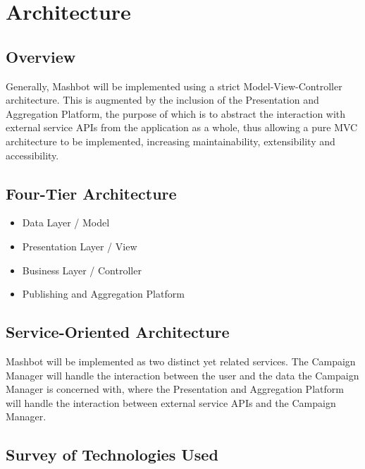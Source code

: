 \documentclass{article}
\begin{document}
\section{Architecture}
\subsection{Overview}
Generally, Mashbot will be implemented using a strict Model-View-Controller architecture.  This is augmented by the inclusion of the Presentation and Aggregation Platform, the purpose of which is to abstract the interaction with external service APIs from the application as a whole, thus allowing a pure MVC architecture to be implemented, increasing maintainability, extensibility and accessibility.
\subsection{Four-Tier Architecture}
\begin{itemize}
\item Data Layer / Model
\item Presentation Layer / View
\item Business Layer / Controller
\item Publishing and Aggregation Platform
\end{itemize}
\subsection{Service-Oriented Architecture}
Mashbot will be implemented as two distinct yet related services.  The Campaign Manager will handle the interaction between the user and the data the Campaign Manager is concerned with, where the Presentation and Aggregation Platform will handle the interaction between external service APIs and the Campaign Manager.
\subsection{Survey of Technologies Used}
\end{document}
